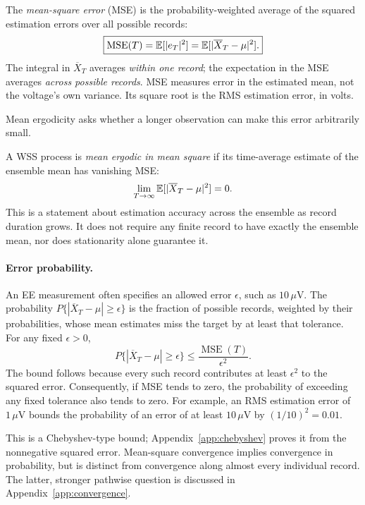 The \emph{mean-square error} (MSE) is the probability-weighted average of the squared estimation errors over all possible records:
\begin{equation}
\boxed{\operatorname{MSE}(T)=\mathbb E[|e_T|^2]
=\mathbb E[|\overline X_T-\mu|^2].}
\label{eq:mean-mse}
\end{equation}
The integral in $\overline X_T$ averages \emph{within one record}; the expectation in the MSE averages \emph{across possible records}. MSE measures error in the estimated mean, not the voltage's own variance. Its square root is the RMS estimation error, in volts.

Mean ergodicity asks whether a longer observation can make this error arbitrarily small.

\begin{concept}[title={Mean ergodicity}]
A WSS process is \emph{mean ergodic in mean square} if its time-average estimate of the ensemble mean has vanishing MSE:
\begin{equation}
\lim_{T\to\infty}\mathbb E[|\overline X_T-\mu|^2]=0.
\label{eq:mean-ergodic}
\end{equation}
This is a statement about estimation accuracy across the ensemble as record duration grows. It does not require any finite record to have exactly the ensemble mean, nor does stationarity alone guarantee it.
\end{concept}

\paragraph{Error probability.}
An EE measurement often specifies an allowed error $\epsilon$, such as $10\,\mu$V. The probability
$P\{|\overline X_T-\mu|\geq\epsilon\}$ is the fraction of possible records, weighted by their probabilities, whose mean estimates miss the target by at least that tolerance. For any fixed $\epsilon>0$,
\[
\boxed{P\{|\overline X_T-\mu|\geq\epsilon\}
\leq\frac{\operatorname{MSE}(T)}{\epsilon^2}.}
\]
The bound follows because every such record contributes at least $\epsilon^2$ to the squared error. Consequently, if MSE tends to zero, the probability of exceeding any fixed tolerance also tends to zero. For example, an RMS estimation error of $1\,\mu$V bounds the probability of an error of at least $10\,\mu$V by $(1/10)^2=0.01$.

This is a Chebyshev-type bound; Appendix~\ref{app:chebyshev} proves it from the nonnegative squared error. Mean-square convergence implies convergence in probability, but is distinct from convergence along almost every individual record. The latter, stronger pathwise question is discussed in Appendix~\ref{app:convergence}.

